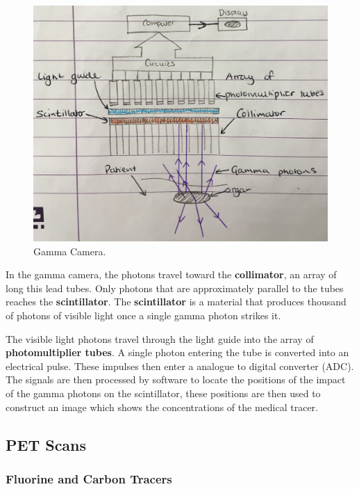 \begin{figure}[h!]
    \centering
    \includegraphics[scale=0.1]{notes/images/Gamma-Camera.JPG}
    \caption{Gamma Camera.}
\end{figure}
\FloatBarrier

In the gamma camera, the photons travel toward the \textbf{collimator}, an array of long this lead tubes. Only photons that are approximately parallel to the tubes reaches the \textbf{scintillator}. The \textbf{scintillator} is a material that produces thousand of photons of visible light once a single gamma photon strikes it.  

The visible light photons travel through the light guide into the array of \textbf{photomultiplier tubes}. A single photon entering the tube is converted into an electrical pulse. These impulses then enter a analogue to digital converter (ADC). The signals are then processed by software to locate the positions of the impact of the gamma photons on the scintillator, these positions are then used to construct an image which shows the concentrations of the medical tracer.  

\subsection{PET Scans}

\subsubsection*{Fluorine and Carbon Tracers}


